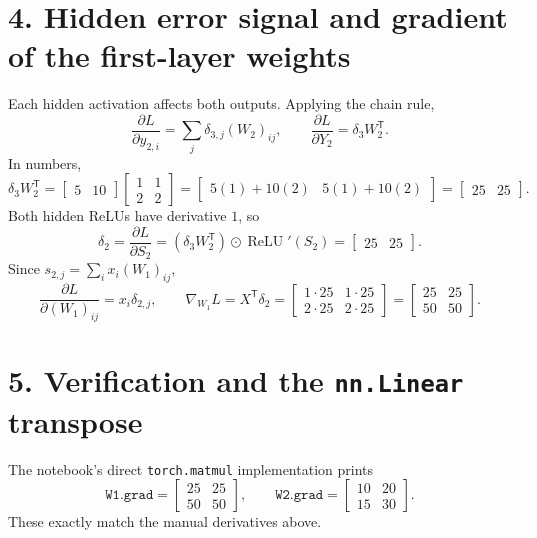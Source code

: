 \documentclass[11pt]{article}
\newcommand{\relu}{\operatorname{ReLU}}
\begin{document}
\section*{4. Hidden error signal and gradient of the first-layer weights}
Each hidden activation affects both outputs. Applying the chain rule,
\[
\frac{\partial L}{\partial y_{2,i}}
 =\sum_j\delta_{3,j}(W_2)_{ij},\qquad
\frac{\partial L}{\partial Y_2}=\delta_3 W_2^{\mathsf T}.
\]
In numbers,
\[
\delta_3 W_2^{\mathsf T}
 =\begin{bmatrix}5&10\end{bmatrix}
  \begin{bmatrix}1&1\\2&2\end{bmatrix}
 =\begin{bmatrix}5(1)+10(2)&5(1)+10(2)\end{bmatrix}
 =\begin{bmatrix}25&25\end{bmatrix}.
\]
Both hidden ReLUs have derivative $1$, so
\[
\delta_2=\frac{\partial L}{\partial S_2}
 =(\delta_3W_2^{\mathsf T})\odot\relu'(S_2)
 =\begin{bmatrix}25&25\end{bmatrix}.
\]
Since $s_{2,j}=\sum_i x_i(W_1)_{ij}$,
\[
\frac{\partial L}{\partial(W_1)_{ij}}=x_i\delta_{2,j},\qquad
\boxed{\nabla_{W_1}L=X^{\mathsf T}\delta_2
 =\begin{bmatrix}1\cdot25&1\cdot25\\2\cdot25&2\cdot25\end{bmatrix}
 =\begin{bmatrix}25&25\\50&50\end{bmatrix}.}
\]

\section*{5. Verification and the \texttt{nn.Linear} transpose}
The notebook's direct \texttt{torch.matmul} implementation prints
\[
\texttt{W1.grad}=\begin{bmatrix}25&25\\50&50\end{bmatrix},\qquad
\texttt{W2.grad}=\begin{bmatrix}10&20\\15&30\end{bmatrix}.
\]
These exactly match the manual derivatives above.
\end{document}
